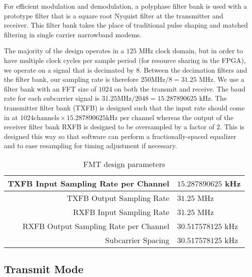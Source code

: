 \documentclass[conference]{IEEEtran}
\begin{document}
For efficient modulation and demodulation, a polyphase filter bank is used with
a prototype filter that is a square root Nyquist filter at the transmitter and
receiver. This filter bank takes the place of traditional pulse shaping and
matched filtering in single carrier narrowband modems.

The majority of the design operates in a $125$ MHz clock domain, but in order
to have multiple clock cycles per sample period (for resource sharing in the FPGA),
we operate on a signal that is decimated by $8$. Between the decimation filters
and the filter bank, our sampling rate is therefore $250 \mbox{MHz} / 8 = 31.25$ MHz.
We use a filter bank with an FFT size of $1024$ on both the transmit and receive.
The baud rate for each subcarrier signal is $31.25 \mbox{MHz} / 2048 = 15.287890625$ kHz.
The transmitter filter bank (TXFB) is designed such that the input rate should come in
at $1024 \mbox{channels} \times 15.287890625 \mbox{kHz per channel}$ whereas the output
of the receiver filter bank {RXFB} is designed to be oversampled by a factor of $2$. This
is designed this way so that software can perform a fractionally-spaced equalizer and to
ease resampling for timing adjustment if necessary.

\begin{table}
\begin{tabular}{|r|l|}
\hline
TXFB Input Sampling Rate per Channel & $15.287890625$ kHz \\
\hline
TXFB Output Sampling Rate & $31.25$ MHz \\
\hline
RXFB Input Sampling Rate & $31.25$ MHz \\
\hline
RXFB Output Sampling Rate per Channel & $30.517578125$ kHz \\
\hline
Subcarrier Spacing & $30.517578125$ kHz \\
\hline
\end{tabular}
\centering
\vspace{0.125in}
\caption[FMT Parameters]{FMT design parameters}
\end{table}

\subsection*{Transmit Mode}
\end{document}
